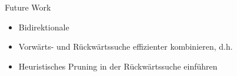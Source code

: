 \begin{frame}{Future Work}
  \begin{itemize}
    \item Bidirektionale
    \item Vorwärts- und Rückwärtssuche effizienter kombinieren, d.h.
    \item Heuristisches Pruning in der Rückwärtssuche einführen
  \end{itemize}
\end{frame}


\thanksframe